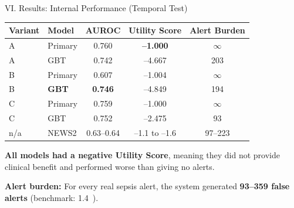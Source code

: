 \begin{frame}{VI. Results: Internal Performance (Temporal Test)}
\begin{center}\tablestyle\footnotesize
\begin{tabular}{llccc}
\toprule
\textbf{Variant} & \textbf{Model} & \textbf{AUROC}
  & \textbf{Utility Score} & \textbf{Alert Burden} \\
\midrule
A   & Primary & 0.760 & \textbf{--1.000}  & $\infty$ \\
A   & GBT     & 0.742 & --4.667           & 203 \\
B   & Primary & 0.607 & --1.004           & $\infty$ \\
B   & \textbf{GBT} & \textbf{0.746} & --4.849 & 194 \\
C   & Primary & 0.759 & --1.000           & $\infty$ \\
C   & GBT     & 0.752 & --2.475           & 93 \\
n/a & NEWS2   & 0.63--0.64 & --1.1 to --1.6 & 97--223 \\
\bottomrule
\end{tabular}
\end{center}

\vspace{4pt}
\textbf{All models had a negative Utility Score}, meaning they did not
provide clinical benefit and performed worse than giving no alerts.

\vspace{2pt}
\textbf{Alert burden:} For every real sepsis alert, the system generated
\textbf{93--359 false alerts} (benchmark: 1.4~\cite{moor2023review}).
\end{frame}


